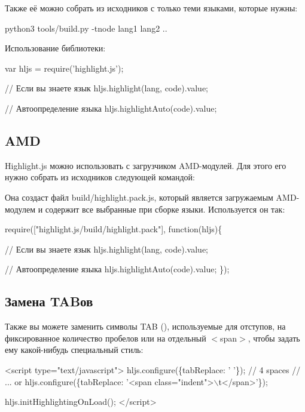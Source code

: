 Также её можно собрать из исходников с только теми языками, которые нужны\+: \begin{DoxyVerb}python3 tools/build.py -tnode lang1 lang2 ..
\end{DoxyVerb}


Использование библиотеки\+:


\begin{DoxyCode}
var hljs = require('highlight.js');

// Если вы знаете язык
hljs.highlight(lang, code).value;

// Автоопределение языка
hljs.highlightAuto(code).value;
\end{DoxyCode}


\subsection*{A\+MD}

Highlight.\+js можно использовать с загрузчиком A\+M\+D-\/модулей. Для этого его нужно собрать из исходников следующей командой\+:




Она создаст файл {\ttfamily build/highlight.\+pack.\+js}, который является загружаемым A\+M\+D-\/модулем и содержит все выбранные при сборке языки. Используется он так\+:


\begin{DoxyCode}
require(["highlight.js/build/highlight.pack"], function(hljs)\{

  // Если вы знаете язык
  hljs.highlight(lang, code).value;

  // Автоопределение языка
  hljs.highlightAuto(code).value;
\});
\end{DoxyCode}


\subsection*{Замена T\+A\+Bов}

Также вы можете заменить символы T\+AB (\textquotesingle{}\textquotesingle{}), используемые для отступов, на фиксированное количество пробелов или на отдельный {\ttfamily $<$span$>$}, чтобы задать ему какой-\/нибудь специальный стиль\+:


\begin{DoxyCode}
<script type="text/javascript">
  hljs.configure(\{tabReplace: '    '\}); // 4 spaces
  // ... or
  hljs.configure(\{tabReplace: '<span class="indent">\(\backslash\)t</span>'\});

  hljs.initHighlightingOnLoad();
</script>
\end{DoxyCode}


